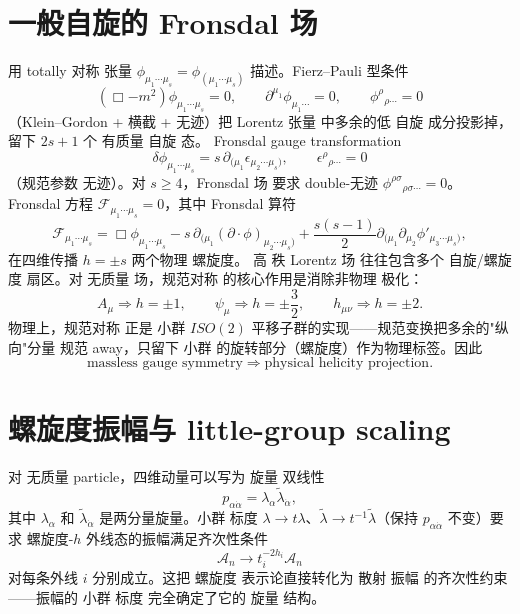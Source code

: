 

\section{一般自旋的 Fronsdal 场}
用 totally 对称 张量 $\phi_{\mu_1\cdots\mu_s}=\phi_{(\mu_1\cdots\mu_s)}$ 描述。Fierz--Pauli 型条件
\begin{equation}
(\Box-m^2)\phi_{\mu_1\cdots\mu_s}=0,\qquad \partial^{\mu_1}\phi_{\mu_1\cdots}=0,\qquad \phi^\rho{}_{\rho\cdots}=0
\end{equation}
（Klein--Gordon + 横截 + 无迹）把 Lorentz 张量 中多余的低 自旋 成分投影掉，留下 $2s+1$ 个 有质量 自旋 态。
Fronsdal gauge transformation
\begin{equation}
\delta\phi_{\mu_1\cdots\mu_s}=s\,\partial_{(\mu_1}\epsilon_{\mu_2\cdots\mu_s)},\qquad \epsilon^\rho{}_{\rho\cdots}=0
\end{equation}
（规范参数 无迹）。对 $s\ge4$，Fronsdal 场 要求 double-无迹 $\phi^{\rho\sigma}{}_{\rho\sigma\cdots}=0$。Fronsdal 方程 $\mathcal{F}_{\mu_1\cdots\mu_s}=0$，其中 Fronsdal 算符
\begin{equation}
\mathcal{F}_{\mu_1\cdots\mu_s}=\Box\phi_{\mu_1\cdots\mu_s}-s\,\partial_{(\mu_1}(\partial\cdot\phi)_{\mu_2\cdots\mu_s)}+\frac{s(s-1)}{2}\partial_{(\mu_1}\partial_{\mu_2}\phi'_{\mu_3\cdots\mu_s)},
\end{equation}
在四维传播 $h=\pm s$ 两个物理 螺旋度。
高 秩 Lorentz 场 往往包含多个 自旋/螺旋度 扇区。对 无质量 场，规范对称 的核心作用是消除非物理 极化：
\begin{equation}
A_\mu\Rightarrow h=\pm 1,\qquad \psi_\mu\Rightarrow h=\pm\frac{3}{2},\qquad h_{\mu\nu}\Rightarrow h=\pm 2.
\end{equation}
物理上，规范对称 正是 小群 $ISO(2)$ 平移子群的实现——规范变换把多余的"纵向"分量 规范 away，只留下 小群 的旋转部分（螺旋度）作为物理标签。因此
\begin{equation}
\text{massless gauge symmetry}\Longrightarrow\text{physical helicity projection}.
\end{equation}



\section{螺旋度振幅与 little-group scaling}

对 无质量 particle，四维动量可以写为 旋量 双线性
\begin{equation}
p_{\alpha\dot\alpha}=\lambda_\alpha\tilde\lambda_{\dot\alpha},
\end{equation}
其中 $\lambda_\alpha$ 和 $\tilde\lambda_{\dot\alpha}$ 是两分量旋量。小群 标度 $\lambda\to t\lambda$、$\tilde\lambda\to t^{-1}\tilde\lambda$（保持 $p_{\alpha\dot\alpha}$ 不变）要求 螺旋度-$h$ 外线态的振幅满足齐次性条件
\begin{equation*}\boxed{\mathcal{A}_n\to t_i^{-2h_i}\mathcal{A}_n}
\end{equation*}
对每条外线 $i$ 分别成立。这把 螺旋度 表示论直接转化为 散射 振幅 的齐次性约束——振幅的 小群 标度 完全确定了它的 旋量 结构。

